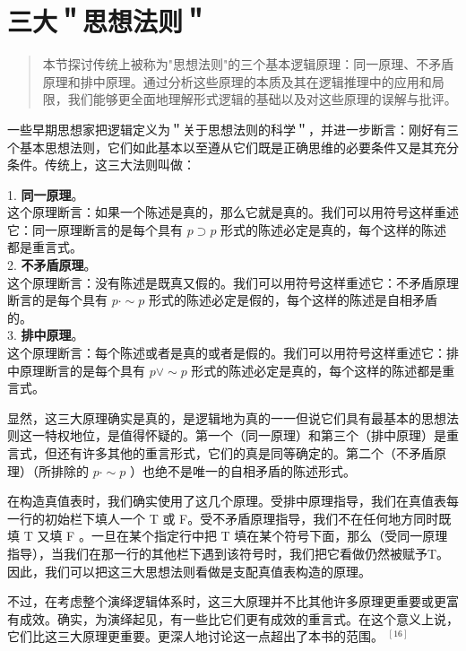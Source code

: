 \section{三大＂思想法则＂}

\begin{quotation}
本节探讨传统上被称为"思想法则"的三个基本逻辑原理：同一原理、不矛盾原理和排中原理。通过分析这些原理的本质及其在逻辑推理中的应用和局限，我们能够更全面地理解形式逻辑的基础以及对这些原理的误解与批评。
\end{quotation}

一些早期思想家把逻辑定义为＂关于思想法则的科学＂，并进一步断言：刚好有三个基本思想法则，它们如此基本以至遵从它们既是正确思维的必要条件又是其充分条件。传统上，这三大法则叫做：

1. \textbf{同一原理}。\\
这个原理断言：如果一个陈述是真的，那么它就是真的。我们可以用符号这样重述它：同一原理断言的是每个具有 $p \supset p$ 形式的陈述必定是真的，每个这样的陈述都是重言式。\\

2. \textbf{不矛盾原理}。\\
这个原理断言：没有陈述是既真又假的。我们可以用符号这样重述它：不矛盾原理断言的是每个具有 $p \cdot \sim p$ 形式的陈述必定是假的，每个这样的陈述是自相矛盾的。\\

3. \textbf{排中原理}。\\
这个原理断言：每个陈述或者是真的或者是假的。我们可以用符号这样重述它：排中原理断言的是每个具有 $p \vee \sim p$ 形式的陈述必定是真的，每个这样的陈述都是重言式。

显然，这三大原理确实是真的，是逻辑地为真的一一但说它们具有最基本的思想法则这一特权地位，是值得怀疑的。第一个（同一原理）和第三个（排中原理）是重言式，但还有许多其他的重言形式，它们的真是同等确定的。第二个（不矛盾原理）（所排除的 $p \cdot \sim p$ ）也绝不是唯一的自相矛盾的陈述形式。

在构造真值表时，我们确实使用了这几个原理。受排中原理指导，我们在真值表每一行的初始栏下填人一个 T 或 F。受不矛盾原理指导，我们不在任何地方同时既填 T 又填 F 。一旦在某个指定行中把 T 填在某个符号下面，那么（受同一原理指导），当我们在那一行的其他栏下遇到该符号时，我们把它看做仍然被赋予T。因此，我们可以把这三大思想法则看做是支配真值表构造的原理。

不过，在考虑整个演绎逻辑体系时，这三大原理并不比其他许多原理更重要或更富有成效。确实，为演绎起见，有一些比它们更有成效的重言式。在这个意义上说，它们比这三大原理更重要。更深人地讨论这一点超出了本书的范围。 ${ }^{[16]}$

